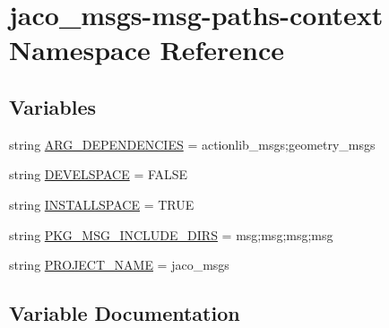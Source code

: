 \hypertarget{namespacejaco__msgs-msg-paths-context}{}\section{jaco\+\_\+msgs-\/msg-\/paths-\/context Namespace Reference}
\label{namespacejaco__msgs-msg-paths-context}
\subsection*{Variables}
\begin{DoxyCompactItemize}
\item 
string \hyperlink{namespacejaco__msgs-msg-paths-context_ac3895b5ef2c57e7c5bbab6bc600b5b98}{A\+R\+G\+\_\+\+D\+E\+P\+E\+N\+D\+E\+N\+C\+I\+ES} = \textquotesingle{}actionlib\+\_\+msgs;geometry\+\_\+msgs\textquotesingle{}
\item 
string \hyperlink{namespacejaco__msgs-msg-paths-context_adffb8432fbac7333d3bc5236b5cc1af1}{D\+E\+V\+E\+L\+S\+P\+A\+CE} = \textquotesingle{}F\+A\+L\+SE\textquotesingle{}
\item 
string \hyperlink{namespacejaco__msgs-msg-paths-context_aa9c588ac9faf9483a91cb495a8be5af4}{I\+N\+S\+T\+A\+L\+L\+S\+P\+A\+CE} = \textquotesingle{}T\+R\+UE\textquotesingle{}
\item 
string \hyperlink{namespacejaco__msgs-msg-paths-context_a615c13a91bdf0d70e95ff767b9bb1f66}{P\+K\+G\+\_\+\+M\+S\+G\+\_\+\+I\+N\+C\+L\+U\+D\+E\+\_\+\+D\+I\+RS} = \textquotesingle{}msg;msg;msg;msg\textquotesingle{}
\item 
string \hyperlink{namespacejaco__msgs-msg-paths-context_a07c6ad829df8f3bb3913008e8a58a711}{P\+R\+O\+J\+E\+C\+T\+\_\+\+N\+A\+ME} = \textquotesingle{}jaco\+\_\+msgs\textquotesingle{}
\end{DoxyCompactItemize}


\subsection{Variable Documentation}
